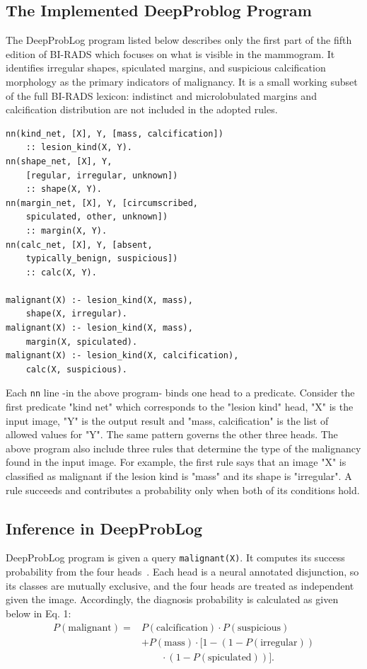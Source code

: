 \subsection{The Implemented DeepProblog Program}
\label{sec:knowledge}
\label{sec:problog}
The DeepProbLog program listed below describes only the first part of the fifth edition of BI-RADS which focuses on what is visible in the mammogram. It identifies irregular shapes, spiculated margins, and suspicious calcification morphology as the primary indicators of malignancy. It is a small working subset of the full BI-RADS lexicon: indistinct and microlobulated margins and calcification distribution are not included in the adopted rules.
\begin{lstlisting}
nn(kind_net, [X], Y, [mass, calcification])
    :: lesion_kind(X, Y).
nn(shape_net, [X], Y,
    [regular, irregular, unknown])
    :: shape(X, Y).
nn(margin_net, [X], Y, [circumscribed,
    spiculated, other, unknown])
    :: margin(X, Y).
nn(calc_net, [X], Y, [absent,
    typically_benign, suspicious])
    :: calc(X, Y).

malignant(X) :- lesion_kind(X, mass),
    shape(X, irregular).
malignant(X) :- lesion_kind(X, mass),
    margin(X, spiculated).
malignant(X) :- lesion_kind(X, calcification),
    calc(X, suspicious).
\end{lstlisting}
 Each \texttt{nn} line -in the above program- binds one head to a predicate. Consider the first predicate "kind net" which corresponds to the "lesion kind" head, "X" is the input image, 
"Y" is the output result  and
"mass, calcification" is the list of allowed values for "Y". The same pattern governs the other three heads. 
The above program also include three rules that determine the type of the malignancy found in the input image. For example, the first rule says that an image "X" is classified as malignant if the  lesion kind is "mass" and its shape is "irregular". A rule succeeds and contributes a  probability only when both of its conditions hold.


\subsection{Inference in DeepProbLog}
\label{sec:inference}

DeepProbLog program is given a query \texttt{malignant(X)}. It computes its success probability from the four heads~\cite{manhaeve2021neural}. Each head is a neural annotated disjunction, so its classes are mutually exclusive, and the four heads are treated as independent given the image. Accordingly, the diagnosis probability is calculated as given below in Eq. 1:
\begin{equation}
\begin{split}
P(\mathrm{malignant}) ={}&
P(\mathrm{calcification}) \cdot P(\mathrm{suspicious})\\
&+ P(\mathrm{mass}) \cdot \Big[
1-(1-P(\mathrm{irregular}))\\
&\qquad\cdot(1-P(\mathrm{spiculated}))
\Big].
\end{split}
\label{eq:query}
\end{equation}

